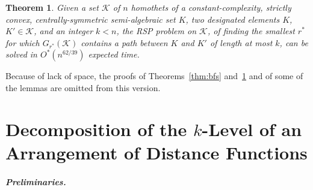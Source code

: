 \documentclass[11pt]{article}
\newif\ifsocgproc
\newif\iffullver
\def\K{\mathcal{K}}
\newtheorem{theorem}{Theorem}[section]
\theoremstyle{definition}
\begin{document}
\begin{theorem} \label{thm:rsp}
Given a set $\K$ of $n$ homothets of a constant-complexity, strictly convex, centrally-symmetric semi-algebraic 
set $K$, two designated elements $K$, $K'\in \K$, and an integer $k < n$, the RSP problem on $\K$, of finding
the smallest $r^*$ for which $G_{r^*}(\K)$ contains a path between $K$ and $K'$ of length at most $k$,
can be solved in $O^*(n^{62/39})$ expected time.
\end{theorem}
\iffullver
\else
Because of lack of space, the proofs of Theorems~\ref{thm:bfs} and~\ref{thm:rsp} and of some of the lemmas are 
omitted from this version.
\fi
%
\ifsocgproc 
\section{Decomposing the $k$-Level of an Arrangement of Distance Functions} \label{sec:vd}
\else
\section{Decomposition of the $k$-Level of an Arrangement of Distance Functions} \label{sec:vd}
\fi
%
\ifsocgproc 
\subparagraph*{Preliminaries.}
\else
\end{document}
